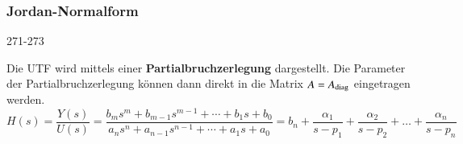 

\subsubsection{Jordan-Normalform}{271-273}

Die UTF wird mittels einer \textbf{Partialbruchzerlegung} dargestellt. Die Parameter der Partialbruchzerlegung können dann
direkt in die Matrix $A = A_{\rm diag}$ eingetragen werden.
$$ H(s) = \frac{Y(s)}{U(s)} = \frac{b_m s^m + b_{m-1} s^{m-1} + \cdots + b_1 s + b_0}
{a_n s^n + a_{n-1} s^{n-1} + \cdots + a_1 s + a_0} = b_n + \frac{\alpha_1}{s - p_1} + \frac{\alpha_2}{s - p_2} + \ldots + \frac{\alpha_n}{s - p_n}$$

